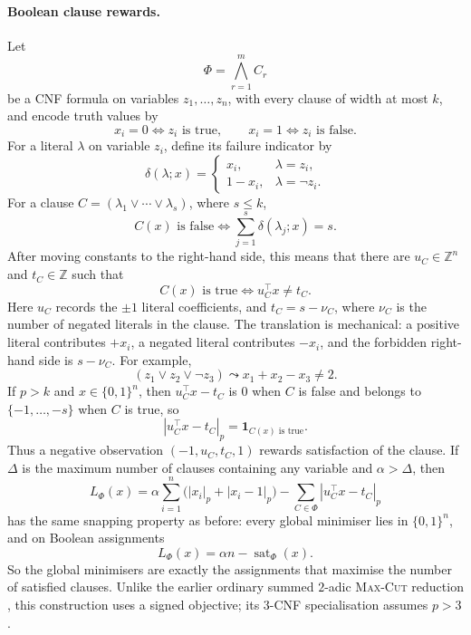 \documentclass[11pt]{article}
\begin{document}
\paragraph{Boolean clause rewards.}
Let
\[
\Phi=\bigwedge_{r=1}^{m} C_r
\]
be a CNF formula on variables \(z_1,\dots,z_n\), with every clause of width at most \(k\), and encode truth values by
\[
x_i=0 \iff z_i \text{ is true},
\qquad
x_i=1 \iff z_i \text{ is false}.
\]
For a literal \(\lambda\) on variable \(z_i\), define its failure indicator by
\[
\delta(\lambda;x)=
\begin{cases}
x_i, & \lambda=z_i,\\
1-x_i, & \lambda=\neg z_i.
\end{cases}
\]
For a clause \(C=(\lambda_1\vee\cdots\vee\lambda_s)\), where \(s\leq k\),
\[
C(x)\text{ is false}
\iff
\sum_{j=1}^{s}\delta(\lambda_j;x)=s.
\]
After moving constants to the right-hand side, this means that there are \(u_C\in\mathbb Z^n\) and \(t_C\in\mathbb Z\) such that
\[
C(x)\text{ is true}
\iff
u_C^\top x\neq t_C.
\]
Here \(u_C\) records the \(\pm 1\) literal coefficients, and \(t_C=s-\nu_C\), where \(\nu_C\) is the number of negated literals in the clause. The translation is mechanical: a positive literal contributes \(+x_i\), a negated literal contributes \(-x_i\), and the forbidden right-hand side is \(s-\nu_C\). For example,
\[
(z_1\vee z_2\vee \neg z_3)
\leadsto
x_1+x_2-x_3\neq 2.
\]
If \(p>k\) and \(x\in\{0,1\}^n\), then \(u_C^\top x-t_C\) is \(0\) when \(C\) is false and belongs to \(\{-1,\dots,-s\}\) when \(C\) is true, so
\[
|u_C^\top x-t_C|_p=\mathbf 1_{C(x)\text{ is true}}.
\]
Thus a negative observation \((-1,u_C,t_C,1)\) rewards satisfaction of the clause. If \(\Delta\) is the maximum number of clauses containing any variable and \(\alpha>\Delta\), then
\[
L_\Phi(x)
=
\alpha\sum_{i=1}^{n}\bigl(|x_i|_p+|x_i-1|_p\bigr)
-\sum_{C\in\Phi}|u_C^\top x-t_C|_p
\]
has the same snapping property as before: every global minimiser lies in \(\{0,1\}^n\), and on Boolean assignments
\[
L_\Phi(x)=\alpha n-\operatorname{sat}_\Phi(x).
\]
So the global minimisers are exactly the assignments that maximise the number of satisfied clauses. Unlike the earlier ordinary summed \(2\)-adic \textsc{Max-Cut} reduction \cite{baker2026nphard}, this construction uses a signed objective; its \(3\)-CNF specialisation assumes \(p>3\).
\end{document}
